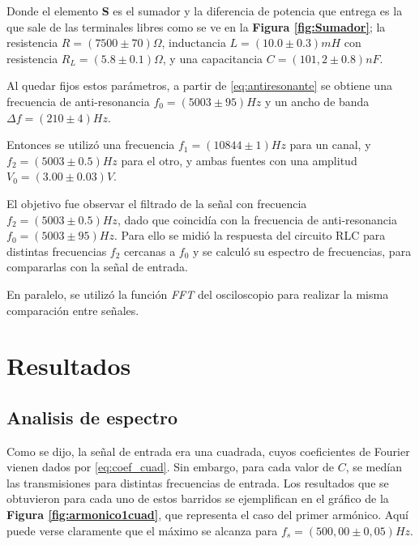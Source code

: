 \documentclass[11pt,a4paper]{article}
\begin{document}
Donde el elemento \textbf{S} es el sumador y la diferencia de potencia que entrega es la que sale de las terminales libres como se ve en la \textbf{Figura \ref{fig:Sumador}}; la resistencia $R=(7500 \pm 70)\Omega$, inductancia $L=(10.0 \pm 0.3)mH$ con resistencia $R_L =(5.8 \pm 0.1)\Omega$, y una capacitancia $C=(101,2 \pm 0.8)nF$.

Al quedar fijos estos parámetros, a partir de \eqref{eq:antiresonante} se obtiene una frecuencia de anti-resonancia $f_0 = (5003 \pm 95)Hz$ y un ancho de banda $\Delta f = (210 \pm 4)Hz$.

Entonces se utilizó una frecuencia $f_1=(10844 \pm 1)Hz$ para un canal, y $f_2=(5003\pm 0.5)Hz$ para el otro, y ambas fuentes con una amplitud $V_0=(3.00 \pm 0.03)V$.

El objetivo fue observar el filtrado de la señal con frecuencia $f_2=(5003\pm 0.5)Hz$, dado que coincidía con la frecuencia de anti-resonancia $f_0 = (5003 \pm 95)Hz$. Para ello se midió la respuesta del circuito RLC para distintas frecuencias $f_2$ cercanas a $f_0$ y se calculó su espectro de frecuencias, para compararlas con la señal de entrada.

En paralelo, se utilizó la función \textit{FFT} del osciloscopio para realizar la misma comparación entre señales.


\section{Resultados}
\label{sec:discusion}

\subsection{Analisis de espectro}
Como se dijo, la señal de entrada era una cuadrada, cuyos coeficientes de Fourier vienen dados por \eqref{eq:coef_cuad}. Sin embargo, para cada valor de $C$, se medían las transmisiones para distintas frecuencias de entrada. Los resultados que se obtuvieron para cada uno de estos barridos se ejemplifican en el gráfico de la \textbf{Figura \ref{fig:armonico1cuad}}, que representa el caso del primer armónico. Aquí puede verse claramente que el máximo se alcanza para $f_s = (500,00 \pm 0,05)Hz$.
\end{document}
